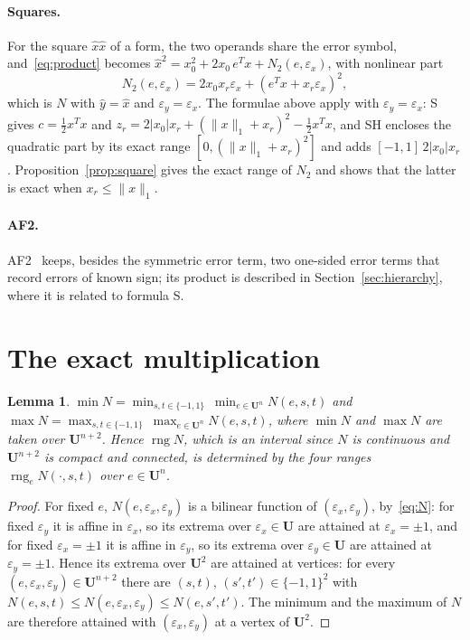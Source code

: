 \documentclass[10pt]{article}
\newtheorem{lemma}{Lemma}
\theoremstyle{definition}
\newcommand{\U}{\mathbf{U}}
\newcommand{\eps}{\varepsilon}
\newcommand{\ex}{\eps_x}
\newcommand{\ey}{\eps_y}
\newcommand{\rng}{\operatorname{rng}}
\begin{document}
\paragraph{Squares.} For the square $\hat x\hat x$ of a form, the two operands share the error symbol, and~\eqref{eq:product} becomes $\hat x^2=x_0^2+2x_0\,e^Tx+N_2(e,\ex)$, with nonlinear part
\begin{equation}
\label{eq:N2}
N_2(e,\ex)=2x_0x_r\ex+(e^Tx+x_r\ex)^2 ,
\end{equation}
which is $N$ with $\hat y=\hat x$ and $\ey=\ex$. The formulae above apply with $\ey=\ex$: S gives $c=\tfrac12x^Tx$ and $z_r=2|x_0|x_r+(\|x\|_1+x_r)^2-\tfrac12x^Tx$, and SH encloses the quadratic part by its exact range $[0,(\|x\|_1+x_r)^2]$ and adds $[-1,1]\,2|x_0|x_r$. Proposition~\ref{prop:square} gives the exact range of $N_2$ and shows that the latter is exact when $x_r\le\|x\|_1$.

\paragraph{AF2.} AF2~\cite{messine2002extentions} keeps, besides the symmetric error term, two one-sided error terms that record errors of known sign; its product is described in Section~\ref{sec:hierarchy}, where it is related to formula S.

\section{The exact multiplication}
\label{sec:exact}

\begin{lemma}
\label{lem:vertices}
$\min N = \min_{s,t\in\{-1,1\}}\ \min_{e\in\U^n} N(e,s,t)$ and $\max N = \max_{s,t\in\{-1,1\}}\ \max_{e\in\U^n} N(e,s,t)$, where $\min N$ and $\max N$ are taken over $\U^{n+2}$. Hence $\rng N$, which is an interval since $N$ is continuous and $\U^{n+2}$ is compact and connected, is determined by the four ranges $\rng_e N(\cdot,s,t)$ over $e\in\U^n$.
\end{lemma}
\begin{proof}
For fixed $e$, $N(e,\ex,\ey)$ is a bilinear function of $(\ex,\ey)$, by~\eqref{eq:N}: for fixed $\ey$ it is affine in $\ex$, so its extrema over $\ex\in\U$ are attained at $\ex=\pm1$, and for fixed $\ex=\pm1$ it is affine in $\ey$, so its extrema over $\ey\in\U$ are attained at $\ey=\pm1$. Hence its extrema over $\U^2$ are attained at vertices: for every $(e,\ex,\ey)\in\U^{n+2}$ there are $(s,t)$, $(s',t')\in\{-1,1\}^2$ with $N(e,s,t)\le N(e,\ex,\ey)\le N(e,s',t')$. The minimum and the maximum of $N$ are therefore attained with $(\ex,\ey)$ at a vertex of $\U^2$.
\end{proof}
\end{document}
